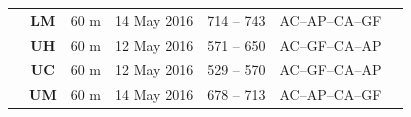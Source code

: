 \documentclass{sfuthesis}
\begin{document}
\begin{landscape}
\begin{table}[]
\begin{tabular}{ccccccl}
                                                                             & \textbf{LM}                                                  & 60 m                                                                     & 14 May 2016   & 714 -- 743                                                                 & AC--AP--CA--GF                                                     &                                                                                                                                                                                                                                                  \\
                                                                             & \textbf{UH}                                                  & 60 m                                                                     & 12 May 2016   & 571 -- 650                                                                 & AC--GF--CA--AP                                                     &                                                                                                                                                                                                                                                  \\
                                                                             & \textbf{UC}                                                  & 60 m                                                                     & 12 May 2016   & 529 -- 570                                                                 & AC--GF--CA--AP                                                     &                                                                                                                                                                                                                                                  \\
                                                                             & \textbf{UM}                                                  & 60 m                                                                     & 14 May 2016   & 678 -- 713                                                                 & AC--AP--CA--GF                                                     &                                                                                                                                                                                                                                                  \\

\end{tabular}
\end{table}
\end{landscape}
\end{document}
